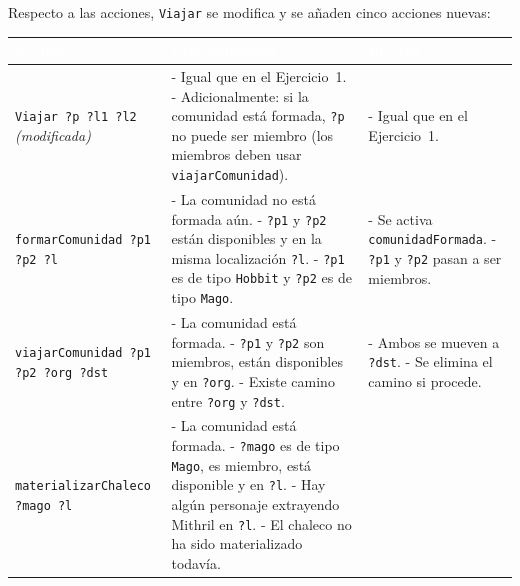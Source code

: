 \documentclass[10pt]{article}
\begin{document}
Respecto a las acciones, \texttt{Viajar} se modifica y se añaden cinco acciones nuevas:

\begin{table}[H]
    \centering
    \begin{tabular}{| m{4cm} | m{6cm} | m{6cm} |}
        \hline
        \rowcolor{maincolor}
        \textcolor{white}{\textbf{Acción}} &
        \centering\arraybackslash\textcolor{white}{\textbf{Precondiciones}} &
        \textcolor{white}{\textbf{Efectos}} \\
        \hline
        \texttt{Viajar ?p ?l1 ?l2} \newline \textit{(modificada)} &
        - Igual que en el Ejercicio~1. \newline
        - Adicionalmente: si la comunidad está formada, \texttt{?p} no puede ser miembro (los miembros deben usar \texttt{viajarComunidad}). &
        - Igual que en el Ejercicio~1. \\
        \hline
        \texttt{formarComunidad ?p1 ?p2 ?l} &
        - La comunidad no está formada aún. \newline
        - \texttt{?p1} y \texttt{?p2} están disponibles y en la misma localización \texttt{?l}. \newline
        - \texttt{?p1} es de tipo \texttt{Hobbit} y \texttt{?p2} es de tipo \texttt{Mago}. &
        - Se activa \texttt{comunidadFormada}. \newline
        - \texttt{?p1} y \texttt{?p2} pasan a ser miembros. \\
        \hline
        \texttt{viajarComunidad ?p1 ?p2 ?org ?dst} &
        - La comunidad está formada. \newline
        - \texttt{?p1} y \texttt{?p2} son miembros, están disponibles y en \texttt{?org}. \newline
        - Existe camino entre \texttt{?org} y \texttt{?dst}. &
        - Ambos se mueven a \texttt{?dst}. \newline
        - Se elimina el camino si procede. \\
        \hline
        \texttt{materializarChaleco ?mago ?l} &
        - La comunidad está formada. \newline
        - \texttt{?mago} es de tipo \texttt{Mago}, es miembro, está disponible y en \texttt{?l}. \newline
        - Hay algún personaje extrayendo Mithril en \texttt{?l}. \newline
        - El chaleco no ha sido materializado todavía. &

\end{tabular}
\end{table}
\end{document}
